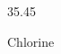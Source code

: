 \documentclass[12pt]{article}
\begin{document}
\hfill{}
\vfill
\begin{center}
  {\fontsize{50}{60}
  }

  \vspace{1em}

  35.45

Chlorine
\end{center}
\vfill
\end{document}
